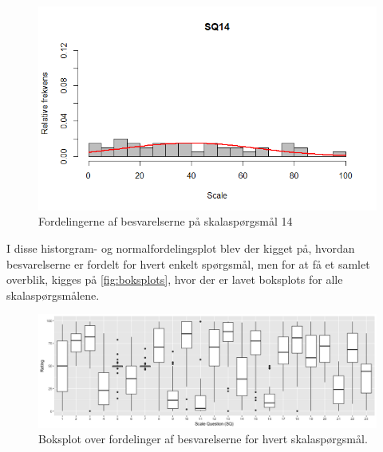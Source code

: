 \begin{figure}[H]
\centering
\includegraphics[width = \textwidth]{Figure/DatabehandlingSkalaer/HistogramNormalFordeling/SQ14} 
\caption{Fordelingerne af besvarelserne på skalaspørgsmål 14}
\label{fig:histogram14}
\end{figure}
\noindent
%
I disse historgram- og normalfordelingsplot blev der kigget på, hvordan besvarelserne er fordelt for hvert enkelt spørgsmål, men for at få et samlet overblik, kigges på \autoref{fig:boksplots}, hvor der er lavet boksplots for alle skalaspørgsmålene. 
%
\begin{figure}[H]
\centering
\includegraphics[width = \textwidth]{Figure/DatabehandlingSkalaer/boksplot0er} 
\caption{Boksplot over fordelinger af besvarelserne for hvert skalaspørgsmål.}
\label{fig:boksplots}
\end{figure}
\noindent
%

